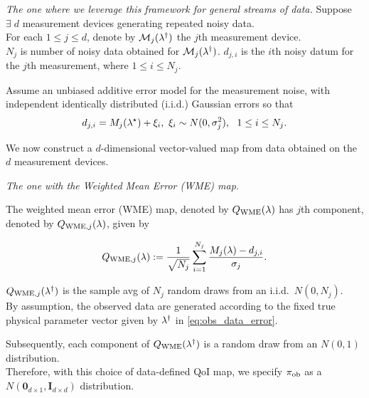 \begin{frame}[t]{\it The one where we leverage this framework for general streams of data.}
\centering
Suppose $\exists \; d$ measurement devices generating repeated noisy data. \\
\vskip 12pt
For each $1\leq j\leq d$, denote by $\mathcal{M}_j(\lambda^\dagger)$ the $j$th measurement device. \\

$N_j$ is number of noisy data obtained for $\mathcal{M}_j(\lambda^\dagger)$.
\vskip 12pt
$d_{j,i}$ is the $i$th noisy datum for the $j$th measurement, where $1\leq i\leq N_j$.

\vskip 12pt
Assume an unbiased additive error model for the measurement noise,
with independent identically distributed (i.i.d.) Gaussian errors so that
\begin{equation}\label{eq:obs_data_error}
	d_{j,i} = M_j(\param^\star) + \xi_i, \ \xi_i\sim N(0,\sigma_j^2), \ \ 1\leq i\leq N_j.
\end{equation}

\vskip 12pt
We now construct a $d$-dimensional vector-valued map from data obtained on the $d$ measurement devices.

\end{frame}


\begin{frame}[t]{\it The one with the Weighted Mean Error (WME) map.}
\centering

The weighted mean error (WME) map, denoted by $Q_\text{WME}(\lambda)$ has $j$th component, denoted by $Q_{\text{WME},j}(\lambda)$, given by

\begin{equation}\label{eq:qoi_WME}
	Q_{\text{WME},j}(\lambda) := \frac{1}{\sqrt{N_j}} \sum_{i=1}^{N_j} \frac{M_j(\lambda)-d_{j,i}}{\sigma_j}.
\end{equation}

\vskip 12pt
$Q_{\text{WME},j}(\lambda^\dagger)$ is the sample avg of $N_j$ random draws from an i.i.d.~$N(0,N_j)$.\\
By assumption, the observed data are generated according to the fixed true physical parameter vector given by $\lambda^\dagger$ in \eqref{eq:obs_data_error}.

\vskip 12pt
Subsequently, each component of $Q_\text{WME}(\lambda^\dagger)$ is a random draw from an $N(0,1)$ distribution.\\
Therefore, with this choice of data-defined QoI map, we specify $\operatorname*{\pi_{ob}}$ as a $N(\mathbf{0}_{d\times 1},\mathbf{I}_{d\times d})$ distribution.

\end{frame}


